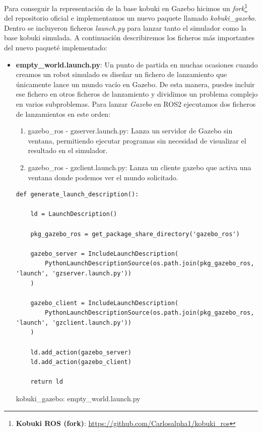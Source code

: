 Para conseguir la representación de la base kobuki en Gazebo hicimos un \textit{fork}\footnote{\textbf{Kobuki ROS (fork)}: \url{https://github.com/Carlosalpha1/kobuki_ros}} del repositorio oficial e implementamos un nuevo paquete llamado \textit{kobuki\_gazebo}. Dentro se incluyeron ficheros \textit{launch.py} para lanzar tanto el simulador como la base kobuki simulada. A continuación describiremos los ficheros más importantes del nuevo paqueté implementado:

\begin{itemize}
	\item \textbf{empty\_world.launch.py}: Un punto de partida en muchas ocasiones cuando creamos un robot simulado es diseñar un fichero de lanzamiento que únicamente lance un mundo vacío en Gazebo. De esta manera, puedes incluir ese fichero en otros ficheros de lanzamiento y dividimos un problema complejo en varios subproblemas. Para lanzar \textit{Gazebo} en ROS2 ejecutamos dos ficheros de lanzamientos en este orden:
	\begin{enumerate}
		\item gazebo\_ros - gzserver.launch.py: Lanza un servidor de Gazebo sin ventana, permitiendo ejecutar programas sin necesidad de visualizar el resultado en el simulador.
		\item gazebo\_ros - gzclient.launch.py: Lanza un cliente gazebo que activa una ventana donde podemos ver el mundo solicitado.
	\end{enumerate}

\begin{code}[H]
\begin{lstlisting}[frame=single]
def generate_launch_description():

	ld = LaunchDescription()

	pkg_gazebo_ros = get_package_share_directory('gazebo_ros')
		
	gazebo_server = IncludeLaunchDescription(
		PythonLaunchDescriptionSource(os.path.join(pkg_gazebo_ros, 'launch', 'gzserver.launch.py'))
	)
		
	gazebo_client = IncludeLaunchDescription(
		PythonLaunchDescriptionSource(os.path.join(pkg_gazebo_ros, 'launch', 'gzclient.launch.py'))
	)
	
	ld.add_action(gazebo_server)
	ld.add_action(gazebo_client)
	
	return ld
\end{lstlisting}
\caption[kobuki\_gazebo: empty\_world.launch.py]{kobuki\_gazebo: empty\_world.launch.py}
\label{cod:kobuki_gazebo_empty_world}
\end{code}


\end{itemize}
